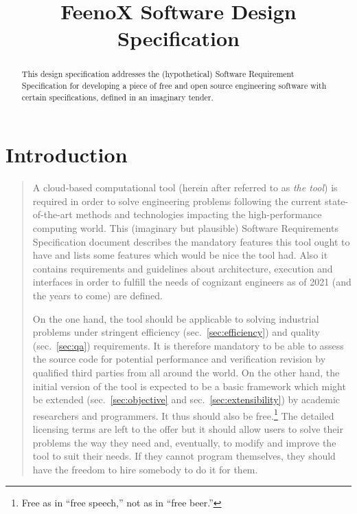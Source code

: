 \documentclass[
  american,
]{article}
\title{FeenoX Software Design Specification}
\author{}
\date{}
\begin{document}

\maketitle
\begin{abstract}
This design specification addresses the (hypothetical) Software
Requirement Specification for developing a piece of free and open source
engineering software with certain specifications, defined in an
imaginary tender.
\end{abstract}


\renewcommand{\vec}[1]{\ensuremath\mathbf{#1}}

\hypertarget{sec:introduction}{%
\section{Introduction}\label{sec:introduction}}

\begin{quote}
A cloud-based computational tool (herein after referred to as \emph{the
tool}) is required in order to solve engineering problems following the
current state-of-the-art methods and technologies impacting the
high-performance computing world. This (imaginary but plausible)
Software Requirements Specification document describes the mandatory
features this tool ought to have and lists some features which would be
nice the tool had. Also it contains requirements and guidelines about
architecture, execution and interfaces in order to fulfill the needs of
cognizant engineers as of 2021 (and the years to come) are defined.

On the one hand, the tool should be applicable to solving industrial
problems under stringent efficiency (sec.~\ref{sec:efficiency}) and
quality (sec.~\ref{sec:qa}) requirements. It is therefore mandatory to
be able to assess the source code for potential performance and
verification revision by qualified third parties from all around the
world. On the other hand, the initial version of the tool is expected to
be a basic framework which might be extended (sec.~\ref{sec:objective}
and sec.~\ref{sec:extensibility}) by academic researchers and
programmers. It thus should also be free.\footnote{Free as in ``free
  speech,'' not as in ``free beer.''} The detailed licensing terms are
left to the offer but it should allow users to solve their problems the
way they need and, eventually, to modify and improve the tool to suit
their needs. If they cannot program themselves, they should have the
freedom to hire somebody to do it for them.
\end{quote}
\end{document}
